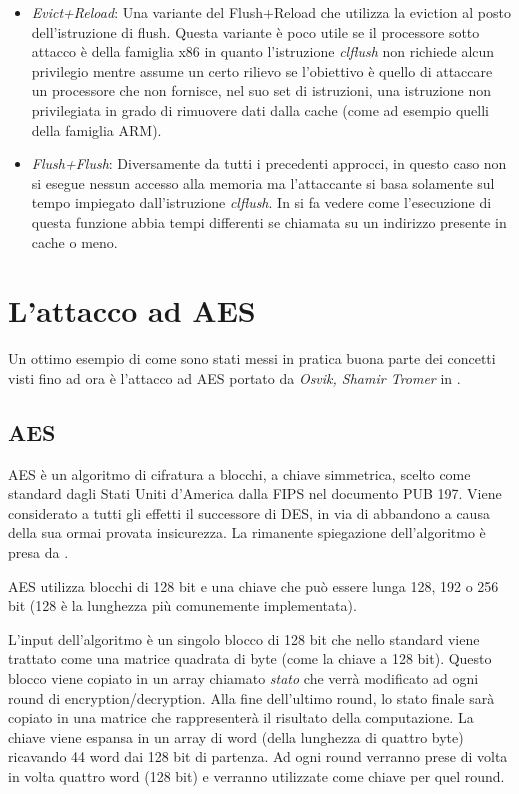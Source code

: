 \begin{itemize}
				\item \emph{Evict+Reload}\cite{gruss2015cache}: Una variante del Flush+Reload che utilizza la eviction al posto dell'istruzione di flush. Questa variante è poco utile se il processore sotto attacco è della famiglia x86 in quanto l'istruzione \emph{clflush} non richiede alcun privilegio mentre assume un certo rilievo se l'obiettivo è quello di attaccare un processore che non fornisce, nel suo set di istruzioni, una istruzione non privilegiata in grado di rimuovere dati dalla cache (come ad esempio quelli della famiglia ARM).
				\item \emph{Flush+Flush}\cite{gruss2016flush+}: Diversamente da tutti i precedenti approcci, in questo caso non si esegue nessun accesso alla memoria ma l'attaccante si basa solamente sul tempo impiegato dall'istruzione \emph{clflush}. In \cite{lipp2016armageddon} si fa vedere come l'esecuzione di questa funzione abbia tempi differenti se chiamata su un indirizzo presente in cache o meno.  
			\end{itemize}
		
		\section{L'attacco ad AES}
			Un ottimo esempio di come sono stati messi in pratica buona parte dei concetti visti fino ad ora è l'attacco ad \ac{AES} portato da \emph{Osvik, Shamir  Tromer} in \cite{osvik2006cache}.
			
			\subsection{AES}
				\ac{AES} è un algoritmo di cifratura a blocchi, a chiave simmetrica, scelto come standard dagli Stati Uniti d'America dalla \ac{FIPS} nel documento PUB 197\cite{pub2001197}. Viene considerato a tutti gli effetti il successore di \ac{DES}, in via di abbandono a causa della sua ormai provata insicurezza\cite{kumar2006breaking,gilmore1998cracking}. La rimanente spiegazione dell'algoritmo è presa da \cite{stallings2012computer}.
				
				\ac{AES} utilizza blocchi di 128 bit e una chiave che può essere lunga 128, 192 o 256 bit (128 è la lunghezza più comunemente implementata).
			
				L'input dell'algoritmo è un singolo blocco di 128 bit che nello standard viene trattato come una matrice quadrata di byte (come la chiave a 128 bit). Questo blocco viene copiato in un array chiamato \emph{stato} che verrà modificato ad ogni round di encryption/decryption. Alla fine dell'ultimo round, lo stato finale sarà copiato in una matrice che rappresenterà il risultato della computazione. La chiave viene espansa in un array di word (della lunghezza di quattro byte) ricavando 44 word dai 128 bit di partenza. Ad ogni round verranno prese di volta in volta quattro word (128 bit) e verranno utilizzate come chiave per quel round.
				
